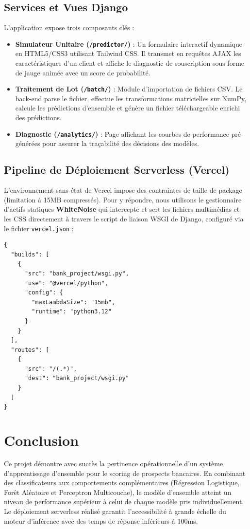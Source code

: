 \documentclass[12pt,a4paper]{article}
\begin{document}
\subsection{Services et Vues Django}
L'application expose trois composants clés :
\begin{itemize}
    \item \textbf{Simulateur Unitaire (\texttt{/predictor/}) } : Un formulaire interactif dynamique en HTML5/CSS3 utilisant Tailwind CSS. Il transmet en requêtes AJAX les caractéristiques d'un client et affiche le diagnostic de souscription sous forme de jauge animée avec un score de probabilité.
    \item \textbf{Traitement de Lot (\texttt{/batch/}) } : Module d'importation de fichiers CSV. Le back-end parse le fichier, effectue les transformations matricielles sur NumPy, calcule les prédictions d'ensemble et génère un fichier téléchargeable enrichi des prédictions.
    \item \textbf{Diagnostic (\texttt{/analytics/}) } : Page affichant les courbes de performance pré-générées pour assurer la traçabilité des décisions des modèles.
\end{itemize}

\subsection{Pipeline de Déploiement Serverless (Vercel)}
L'environnement sans état de Vercel impose des contraintes de taille de package (limitation à 15MB compressés). Pour y répondre, nous utilisons le gestionnaire d'actifs statiques \textbf{WhiteNoise} qui intercepte et sert les fichiers multimédias et les CSS directement à travers le script de liaison WSGI de Django, configuré via le fichier \texttt{vercel.json} :
\begin{lstlisting}[language={}, caption=Configuration vercel.json de l'application Bank]
{
  "builds": [
    {
      "src": "bank_project/wsgi.py",
      "use": "@vercel/python",
      "config": {
        "maxLambdaSize": "15mb",
        "runtime": "python3.12"
      }
    }
  ],
  "routes": [
    {
      "src": "/(.*)",
      "dest": "bank_project/wsgi.py"
    }
  ]
}
\end{lstlisting}

\section{Conclusion}
Ce projet démontre avec succès la pertinence opérationnelle d'un système d'apprentissage d'ensemble pour le scoring de prospects bancaires. En combinant des classificateurs aux comportements complémentaires (Régression Logistique, Forêt Aléatoire et Perceptron Multicouche), le modèle d'ensemble atteint un niveau de performance supérieur à celui de chaque modèle pris individuellement. Le déploiement serverless réalisé garantit l'accessibilité à grande échelle du moteur d'inférence avec des temps de réponse inférieurs à 100ms.
\end{document}
